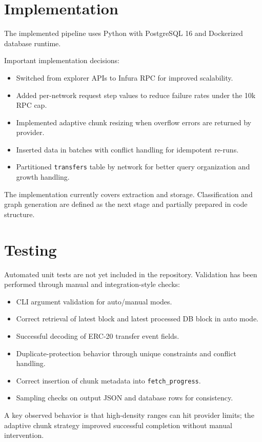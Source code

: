 \documentclass[a4paper,12pt]{report}
\begin{document}
\section{Implementation}
The implemented pipeline uses Python with PostgreSQL 16 and Dockerized database runtime.

Important implementation decisions:
\begin{itemize}
\item Switched from explorer APIs to Infura RPC for improved scalability.
\item Added per-network request step values to reduce failure rates under the 10k RPC cap.
\item Implemented adaptive chunk resizing when overflow errors are returned by provider.
\item Inserted data in batches with conflict handling for idempotent re-runs.
\item Partitioned \texttt{transfers} table by network for better query organization and growth handling.
\end{itemize}

The implementation currently covers extraction and storage. Classification and graph generation are
defined as the next stage and partially prepared in code structure.

\section{Testing}
Automated unit tests are not yet included in the repository. Validation has been performed through
manual and integration-style checks:
\begin{itemize}
\item CLI argument validation for auto/manual modes.
\item Correct retrieval of latest block and latest processed DB block in auto mode.
\item Successful decoding of ERC-20 transfer event fields.
\item Duplicate-protection behavior through unique constraints and conflict handling.
\item Correct insertion of chunk metadata into \texttt{fetch\_progress}.
\item Sampling checks on output JSON and database rows for consistency.
\end{itemize}

A key observed behavior is that high-density ranges can hit provider limits; the adaptive chunk
strategy improved successful completion without manual intervention.
\end{document}
